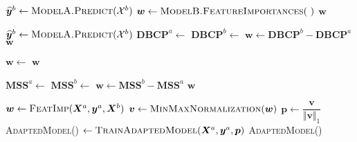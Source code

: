 \documentclass{article}
\begin{document}
\begin{algorithm}
	\caption{}
	\begin{algorithmic}[1]
		\State {}
		\State $\widehat{\bm{y}}^b \gets \Call{ModelA.Predict}{\mathcal{X}^b}$
		\State {}
		\State $\bm{w} \gets \Call{ModelB.FeatureImportances}{\ }$
		\State \Return $\bm{w}$
		\EndFunction
	\end{algorithmic}
\end{algorithm}

\begin{algorithm}
	\caption{}
	\begin{algorithmic}[1]
		\State {}
		\State $\widehat{\bm{y}}^b \gets \Call{ModelA.Predict}{\mathcal{X}^b}$
		\State {}
		\State $\textbf{DBCP}^a \gets$ 
		\State $\textbf{DBCP}^b \gets$ 
		\State $\bm{w} \gets \textbf{DBCP}^b - \textbf{DBCP}^a$
		\State \Return $\bm{w}$
		\EndFunction
	\end{algorithmic}
\end{algorithm}

\begin{algorithm}
	\caption{}
	\begin{algorithmic}[1]
		\State {}
		\State $\bm{w} \gets$ 
		\State \Return $\bm{w}$
		\EndFunction
	\end{algorithmic}
\end{algorithm}

\begin{algorithm}
	\caption{}
	\begin{algorithmic}[1]
		\State {}
		\State $\textbf{MSS}^a \gets$ 
		\State $\textbf{MSS}^b \gets$ 
		\State $\bm{w} \gets \textbf{MSS}^b - \textbf{MSS}^a$
		\State \Return $\bm{w}$
		\EndFunction
	\end{algorithmic}
\end{algorithm}

\begin{algorithm}
	\caption{}
	\begin{algorithmic}[1]
		\State $\bm{w} \gets \Call{FeatImp}{\bm{X}^a,\bm{y}^a,\bm{X}^b} $
		\State $\bm{v} \gets \Call{MinMaxNormalization}{\bm{w}}$ \Comment{}
		\State $\bm{p} \gets \dfrac{\bm{v}}{\big\Vert\bm{v}\big\Vert_1}$ 
		\State \textsc{AdaptedModel}() $\gets \Call{TrainAdaptedModel}{\bm{X}^a,\bm{y}^a, \bm{p}}$
		\State \Return \textsc{AdaptedModel}()
		\EndFunction
	\end{algorithmic}
\end{algorithm}
\end{document}

